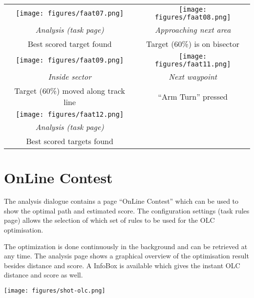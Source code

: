 \begin{maxipage}
\begin{center}
\begin{longtable}{|c|c|}
\toprule
\texttt{[image: figures/faat07.png]} & 
\texttt{[image: figures/faat08.png]} \\
{\em Analysis (task page)} & {\em Approaching next area} \\
Best scored target found & Target (60\%) is on bisector \\

\midrule
\texttt{[image: figures/faat09.png]} & 
\texttt{[image: figures/faat11.png]} \\
{\em Inside sector} & {\em Next waypoint} \\
Target (60\%) moved along track line & ``Arm Turn'' pressed \\

\midrule
\texttt{[image: figures/faat12.png]} &  \\
{\em Analysis (task page)} &  \\
Best scored targets found &  \\

\bottomrule
\end{longtable}
\end{center}
\end{maxipage}

\section{OnLine Contest}

The analysis dialogue contains a page ``OnLine Contest'' which can be
used to show the optimal path and estimated score.  The configuration settings  
(task rules page) allows the selection of which set of rules to be used for the
OLC optimisation.

The optimization is done continuously in the background and can be retrieved at
any time. The analysis page shows a graphical overview of the optimisation
result besides distance and score. A InfoBox is available which gives the
instant OLC distance and score as well.

\begin{center}
\texttt{[image: figures/shot-olc.png]}
\end{center}

